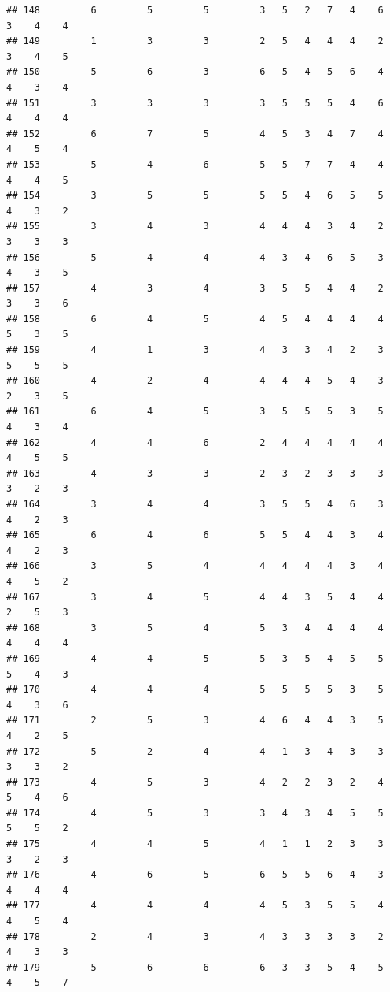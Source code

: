 \documentclass[
]{article}
\begin{document}
\begin{verbatim}
## 148         6         5         5         3   5   2   7   4    6    3    4    4
## 149         1         3         3         2   5   4   4   4    2    3    4    5
## 150         5         6         3         6   5   4   5   6    4    4    3    4
## 151         3         3         3         3   5   5   5   4    6    4    4    4
## 152         6         7         5         4   5   3   4   7    4    4    5    4
## 153         5         4         6         5   5   7   7   4    4    4    4    5
## 154         3         5         5         5   5   4   6   5    5    4    3    2
## 155         3         4         3         4   4   4   3   4    2    3    3    3
## 156         5         4         4         4   3   4   6   5    3    4    3    5
## 157         4         3         4         3   5   5   4   4    2    3    3    6
## 158         6         4         5         4   5   4   4   4    4    5    3    5
## 159         4         1         3         4   3   3   4   2    3    5    5    5
## 160         4         2         4         4   4   4   5   4    3    2    3    5
## 161         6         4         5         3   5   5   5   3    5    4    3    4
## 162         4         4         6         2   4   4   4   4    4    4    5    5
## 163         4         3         3         2   3   2   3   3    3    3    2    3
## 164         3         4         4         3   5   5   4   6    3    4    2    3
## 165         6         4         6         5   5   4   4   3    4    4    2    3
## 166         3         5         4         4   4   4   4   3    4    4    5    2
## 167         3         4         5         4   4   3   5   4    4    2    5    3
## 168         3         5         4         5   3   4   4   4    4    4    4    4
## 169         4         4         5         5   3   5   4   5    5    5    4    3
## 170         4         4         4         5   5   5   5   3    5    4    3    6
## 171         2         5         3         4   6   4   4   3    5    4    2    5
## 172         5         2         4         4   1   3   4   3    3    3    3    2
## 173         4         5         3         4   2   2   3   2    4    5    4    6
## 174         4         5         3         3   4   3   4   5    5    5    5    2
## 175         4         4         5         4   1   1   2   3    3    3    2    3
## 176         4         6         5         6   5   5   6   4    3    4    4    4
## 177         4         4         4         4   5   3   5   5    4    4    5    4
## 178         2         4         3         4   3   3   3   3    2    4    3    3
## 179         5         6         6         6   3   3   5   4    5    4    5    7

\end{verbatim}
\end{document}
